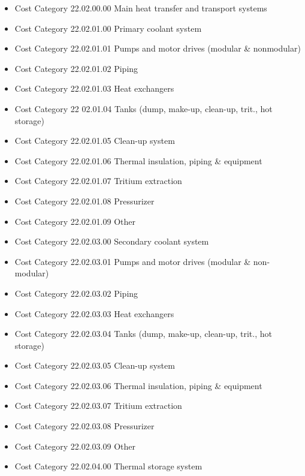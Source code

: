 \begin{itemize}
\item Cost Category 22.02.00.00    Main heat transfer and transport systems	
\item Cost Category 22.02.01.00      Primary coolant system				
\item Cost Category 22.02.01.01        Pumps and  motor drives (modular \& nonmodular)				
\item Cost Category 22.02.01.02        Piping				
\item Cost Category 22.02.01.03        Heat exchangers				
\item Cost Category 22 02.01.04        Tanks (dump, make-up, clean-up, trit., hot storage)				
\item Cost Category 22.02.01.05        Clean-up system				
\item Cost Category 22.02.01.06        Thermal insulation, piping \& equipment				
\item Cost Category 22.02.01.07        Tritium extraction				
\item Cost Category 22.02.01.08        Pressurizer				
\item Cost Category 22.02.01.09        Other				
\item Cost Category 22.02.03.00      Secondary coolant system				
\item Cost Category 22.02.03.01        Pumps and motor drives (modular \& non-modular)				
\item Cost Category 22.02.03.02        Piping				
\item Cost Category 22.02.03.03        Heat exchangers				
\item Cost Category 22.02.03.04        Tanks (dump, make-up, clean-up, trit., hot storage)				
\item Cost Category 22.02.03.05        Clean-up system				
\item Cost Category 22.02.03.06        Thermal insulation, piping \& equipment				
\item Cost Category 22.02.03.07        Tritium extraction				
\item Cost Category 22.02.03.08        Pressurizer				
\item Cost Category 22.02.03.09        Other				
\item Cost Category 22.02.04.00      Thermal storage system  
\end{itemize}


